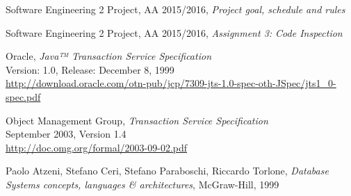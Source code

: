 \begin{thebibliography}{1}
    	Software Engineering 2 Project, AA 2015/2016, \emph{Project goal, schedule and rules}

    	Software Engineering 2 Project, AA 2015/2016, \emph{Assignment 3: Code Inspection}

    Oracle, \emph{Java™ Transaction Service Specification}\\
    Version: 1.0, Release: December 8, 1999\\
    \url{http://download.oracle.com/otn-pub/jcp/7309-jts-1.0-spec-oth-JSpec/jts1_0-spec.pdf}

    Object Management Group,
    \emph{Transaction Service Specification}\\
    September 2003, Version 1.4\\
    \url{http://doc.omg.org/formal/2003-09-02.pdf}

        Paolo Atzeni, Stefano Ceri, Stefano Paraboschi, Riccardo Torlone, \emph{Database Systems concepts, languages \& architectures}, McGraw-Hill, 1999
\end{thebibliography}
